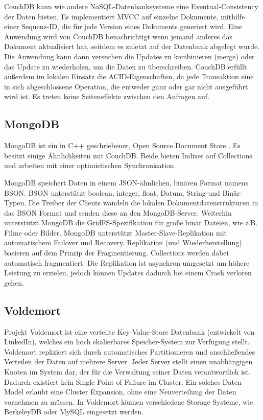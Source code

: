 CouchDB kann wie andere NoSQL-Datenbanksysteme eine Eventual-Consistency der Daten bieten. Es implementiert MVCC auf einzelne Dokumente, mithilfe einer Sequenz-ID, die für jede Version eines Dokuments generiert wird. Eine Anwendung wird von CouchDB benachrichtigt wenn jemand anderes das Dokument aktualisiert hat, seitdem es zuletzt auf der Datenbank abgelegt wurde. Die Anwendung kann dann versuchen die Updates zu kombinieren (merge) oder das Update zu wiederholen, um die Daten zu überschreiben. CouchDB erfüllt außerdem im lokalen Einsatz die ACID-Eigenschaften, da jede Transaktion eine in sich abgeschlossene Operation, die entweder ganz oder gar nicht ausgeführt wird ist. Es treten keine Seiteneffekte zwischen den Anfragen auf.

\subsection{MongoDB}
\label{ch:AnalyseDatenbanken:sec:Datenbanken:subsec:MongoDB}

MongoDB ist ein in C++ geschriebener, Open Source Document Store \cite{books/daglib/0025185}. Es besitzt einige Ähnlichkeiten mit CouchDB. Beide bieten Indizes auf Collections und arbeiten mit einer optimistischen Synchronisation.

MongoDB speichert Daten in einem JSON-ähnlichen, binären Format namens BSON. BSON unterstützt boolean, integer, float, Datum, String-und Binär-Typen. Die Treiber der Clients wandeln die lokalen Dokumentdatenstrukturen in das BSON Format und senden diese an den MongoDB-Server. Weiterhin unterstützt MongoDB die GridFS-Spezifikation für große binär Dateien, wie z.B. Filme oder Bilder. MongoDB unterstützt Master-Slave-Replikation mit automatischem Failover und Recovery. Replikation (und Wiederherstellung) basieren auf dem Prinzip der Fragmentierung. Collections werden dabei automatisch fragmentiert. Die Replikation ist asynchron umgesetzt um höhere Leistung zu erzielen, jedoch können Updates dadurch bei einem Crash verloren gehen. 

\subsection{Voldemort}
\label{ch:AnalyseDatenbanken:sec:Datenbanken:subsec:Voldemort}

Projekt Voldemort \cite{vod2013} ist eine verteilte Key-Value-Store Datenbank (entwickelt von LinkedIn), welches ein hoch skalierbares Speicher-System zur Verfügung stellt. Voldemort repliziert sich durch automatisches Partitionieren und anschließendes Verteilen der Daten auf mehrere Server. Jeder Server stellt einen unabhängigen Knoten im System dar, der für die Verwaltung seiner Daten verantwortlich ist. Dadurch existiert kein Single Point of Failure im Cluster. Ein solches Daten Model erlaubt eine Cluster Expansion, ohne eine Neuverteilung der Daten vornehmen zu müssen. In Voldemort können verschiedene Storage Systeme, wie BerkeleyDB oder MySQL eingesetzt werden. 

